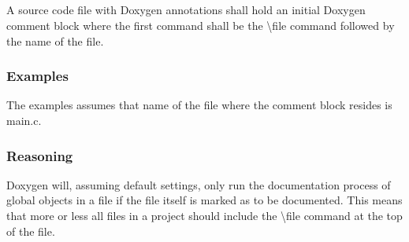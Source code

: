 \subsection*{\doxygenRule{}}

A source code file with Doxygen annotations shall hold an initial Doxygen comment block where the first command shall be the \textbackslash file command followed by the name of the file.

\subsubsection*{Examples}

The examples assumes that name of the file where the comment block resides is main.c.

\noindent
\begin{minipage}[t]{0.47\textwidth}
    
\end{minipage}\hfill
\begin{minipage}[t]{0.47\textwidth}
    
\end{minipage}

\subsubsection*{Reasoning}

Doxygen will, assuming default settings, only run the documentation process of global objects in a file if the file itself is marked as to be documented. This means that more or less all files in a project should include the \textbackslash file command at the top of the file.
